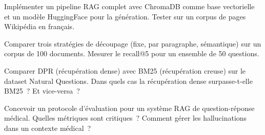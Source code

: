 \begin{exercice}
Impl\'ementer un pipeline RAG complet avec ChromaDB comme base vectorielle
et un mod\`ele HuggingFace pour la g\'en\'eration. Tester sur un corpus
de pages Wikip\'edia en fran\c{c}ais.
\end{exercice}

\begin{exercice}
Comparer trois strat\'egies de d\'ecoupage (fixe, par paragraphe,
s\'emantique) sur un corpus de 100 documents. Mesurer le recall@5 pour
un ensemble de 50 questions.
\end{exercice}

\begin{exercice}[DPR vs BM25]
Comparer DPR (r\'ecup\'eration dense) avec BM25 (r\'ecup\'eration
creuse) sur le dataset Natural Questions. Dans quels cas la r\'ecup\'eration
dense surpasse-t-elle BM25~? Et vice-versa~?
\end{exercice}

\begin{exercice}
Concevoir un protocole d'\'evaluation pour un syst\`eme RAG de question-r\'eponse
m\'edical. Quelles m\'etriques sont critiques~? Comment g\'erer les
hallucinations dans un contexte m\'edical~?
\end{exercice}
